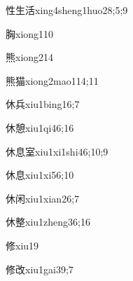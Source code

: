 \begin{verbete}{性生活}{xing4sheng1huo2}{8;5;9}
\end{verbete}

\begin{verbete}{胸}{xiong1}{10}
\end{verbete}

\begin{verbete}{熊}{xiong2}{14}
\end{verbete}

\begin{verbete}{熊猫}{xiong2mao1}{14;11}
\end{verbete}

\begin{verbete}{休兵}{xiu1bing1}{6;7}
\end{verbete}

\begin{verbete}{休憩}{xiu1qi4}{6;16}
\end{verbete}

\begin{verbete}{休息室}{xiu1xi1shi4}{6;10;9}
\end{verbete}

\begin{verbete}{休息}{xiu1xi5}{6;10}
\end{verbete}

\begin{verbete}{休闲}{xiu1xian2}{6;7}
\end{verbete}

\begin{verbete}{休整}{xiu1zheng3}{6;16}
\end{verbete}

\begin{verbete}{修}{xiu1}{9}
\end{verbete}

\begin{verbete}{修改}{xiu1gai3}{9;7}
\end{verbete}


